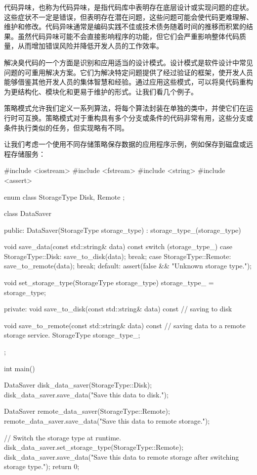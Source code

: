 代码异味，也称为代码异味，是指代码库中表明存在底层设计或实现问题的症状。这些症状不一定是错误，但表明存在潜在问题，这些问题可能会使代码更难理解、维护和修改。代码异味通常是编码实践不佳或技术债务随着时间的推移而积累的结果。虽然代码异味可能不会直接影响程序的功能，但它们会严重影响整体代码质量，从而增加错误风险并降低开发人员的工作效率。

解决臭代码的一个方面是识别和应用适当的设计模式。设计模式是软件设计中常见问题的可重用解决方案。它们为解决特定问题提供了经过验证的框架，使开发人员能够借鉴其他开发人员的集体智慧和经验。通过应用这些模式，可以将臭代码重构为更结构化、模块化和更易于维护的形式。让我们看几个例子。

策略模式允许我们定义一系列算法，将每个算法封装在单独的类中，并使它们在运行时可互换。策略模式对于重构具有多个分支或条件的代码非常有用，这些分支或条件执行类似的任务，但实现略有不同。

让我们考虑一个使用不同存储策略保存数据的应用程序示例，例如保存到磁盘或远程存储服务：

\begin{cpp}
#include <iostream>
#include <fstream>
#include <string>
#include <assert>

enum class StorageType {
    Disk,
    Remote
};

class DataSaver {
public:
    DataSaver(StorageType storage_type) : storage_type_(storage_type)
    {}

    void save_data(const std::string& data) const {
        switch (storage_type_) {
            case StorageType::Disk:
            save_to_disk(data);
            break;
            case StorageType::Remote:
            save_to_remote(data);
            break;
            default:
            assert(false && "Unknown storage type.");
        }
    }

    void set_storage_type(StorageType storage_type) {
        storage_type_ = storage_type;
    }

private:
    void save_to_disk(const std::string& data) const {
        // saving to disk
    }

    void save_to_remote(const std::string& data) const {
        // saving data to a remote storage service.
    }
    StorageType storage_type_;
};

int main() {
    DataSaver disk_data_saver(StorageType::Disk);
    disk_data_saver.save_data("Save this data to disk.");

    DataSaver remote_data_saver(StorageType::Remote);
    remote_data_saver.save_data("Save this data to remote storage.");

    // Switch the storage type at runtime.
    disk_data_saver.set_storage_type(StorageType::Remote);
    disk_data_saver.save_data("Save this data to remote storage after switching storage type.");
    return 0;
}
\end{cpp}

